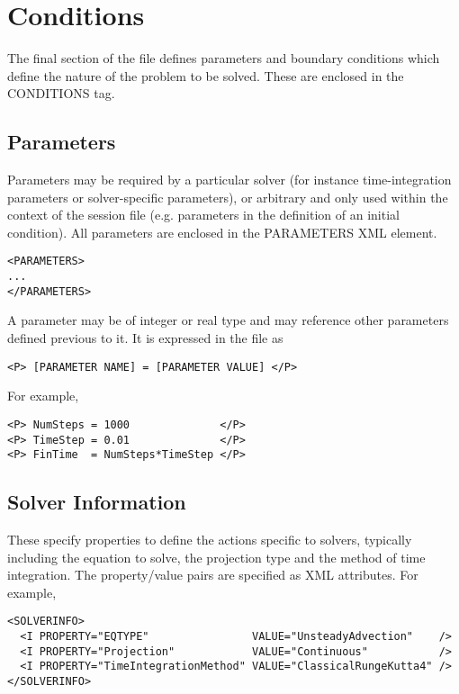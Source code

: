 \section{Conditions}
The final section of the file defines parameters and boundary conditions which define the nature of the problem to be solved. These are enclosed in the CONDITIONS tag.

\subsection{Parameters}

Parameters may be required by a particular solver (for instance time-integration parameters or solver-specific parameters), or arbitrary and only used within the context of the session file (e.g. parameters in the definition of an initial condition). All parameters are enclosed in the PARAMETERS XML element.
\begin{lstlisting}[style=XMLStyle]
<PARAMETERS>
...
</PARAMETERS>
\end{lstlisting}
A parameter may be of integer or real type and may reference other parameters defined previous to it. It is expressed in the file as

\begin{lstlisting}[style=XMLStyle]
<P> [PARAMETER NAME] = [PARAMETER VALUE] </P>
\end{lstlisting}
For example,

\begin{lstlisting}[style=XMLStyle]
<P> NumSteps = 1000              </P>
<P> TimeStep = 0.01              </P>
<P> FinTime  = NumSteps*TimeStep </P>
\end{lstlisting}

\subsection{Solver Information}

These specify properties to define the actions specific to solvers, typically including the equation to solve, the projection type and the method of time integration. The property/value pairs are specified as XML attributes. For example,
\begin{lstlisting}[style=XMLStyle]
<SOLVERINFO>
  <I PROPERTY="EQTYPE"                VALUE="UnsteadyAdvection"    />
  <I PROPERTY="Projection"            VALUE="Continuous"           />
  <I PROPERTY="TimeIntegrationMethod" VALUE="ClassicalRungeKutta4" />
</SOLVERINFO>
\end{lstlisting}

